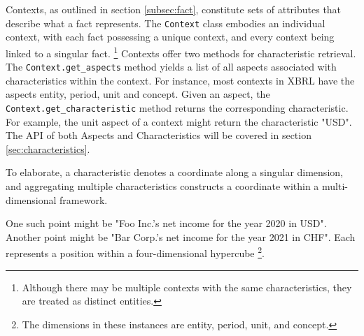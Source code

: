 Contexts, as outlined in section \ref{subsec:fact}, constitute sets of attributes that describe what a fact represents.
The \texttt{Context} class embodies an individual context, with each fact possessing a unique context, and every context being linked to a singular fact.
\footnote{Although there may be multiple contexts with the same characteristics, they are treated as distinct entities.}
Contexts offer two methods for characteristic retrieval.
The \texttt{Context.get\_aspects} method yields a list of all aspects associated with characteristics within the context.
For instance, most contexts in XBRL have the aspects entity, period, unit and concept.
Given an aspect, the \texttt{Context.get\_characteristic} method returns the corresponding characteristic.
For example, the unit aspect of a context might return the characteristic "USD".
The API of both Aspects and Characteristics will be covered in section \ref{sec:characteristics}.

To elaborate, a characteristic denotes a coordinate along a singular dimension, 
and aggregating multiple characteristics constructs a coordinate within a multi-dimensional framework.

One such point might be "Foo Inc.'s net income for the year 2020 in USD".\label{point:foo_net_income}
Another point might be "Bar Corp.'s net income for the year 2021 in CHF".
Each represents a position within a four-dimensional hypercube
\footnote{The dimensions in these instances are entity, period, unit, and concept.}.

